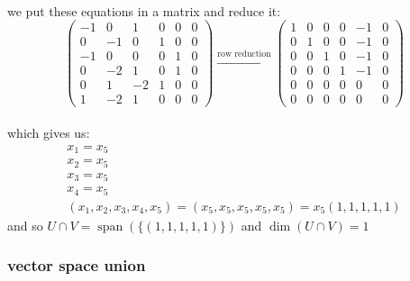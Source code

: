 \documentclass[a4paper,12pt]{article}
\DeclareMathOperator{\spn}{span}
\begin{document}
\begin{definition}
\begin{my_example}
\begin{step}
\[\]\\
we put these equations in a matrix and reduce it:\\
\[
  \left(\begin{array}{ccccc|c} -1 & 0 & 1 & 0 & 0 & 0\\ 0 & -1 & 0 & 1 & 0 & 0\\ -1 & 0 & 0 & 0 & 1 & 0\\ 0 & -2 & 1 & 0 & 1 & 0\\ 0 & 1 & -2 & 1 & 0 & 0\\ 1 & -2 & 1 & 0 & 0 & 0 \end{array}\right) \xrightarrow{\text{row reduction}} \left(\begin{array}{ccccc|c} 1 & 0 & 0 & 0 & -1 & 0\\0 & 1 & 0 & 0 & -1 & 0\\0 & 0 & 1 & 0 & -1 & 0\\0 & 0 & 0 & 1 & -1 & 0\\0 & 0 & 0 & 0 & 0 & 0\\0 & 0 & 0 & 0 & 0 & 0\end{array}\right)
\]\\
which gives us:\\
\begin{gather*}
  x_1=x_5\\
  x_2=x_5\\
  x_3=x_5\\
  x_4=x_5\\
  (x_1,x_2,x_3,x_4,x_5)=(x_5,x_5,x_5,x_5,x_5) = x_5(1,1,1,1,1)
\end{gather*}
and so \(U \cap V = \spn(\{(1,1,1,1,1)\})\) and \(\dim(U \cap V) = 1\)\\
\end{step}
\end{my_example}
\end{definition}
\subsubsection{vector space union}
\label{sec:orgc2dbc6b}
\end{document}
